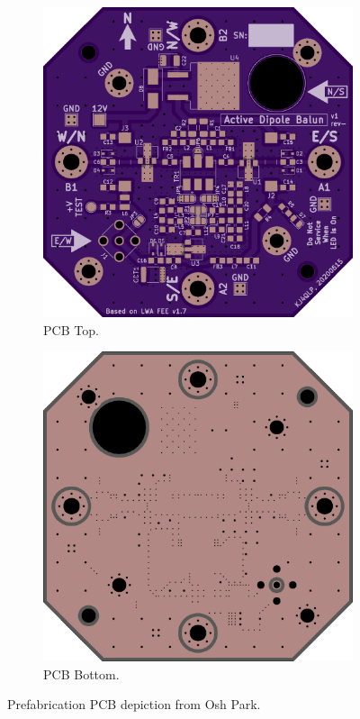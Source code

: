 \begin{figure}[h]
  \centering
  \begin{subfigure}{.45\textwidth}
    \centering
    \includegraphics[width=0.95\linewidth]{figures/osh_park_top_view.png}
    \caption{PCB Top.}
	\label{fig:osh_park:top}
  \end{subfigure}%
  \begin{subfigure}{.45\textwidth}
    \centering
    \includegraphics[width=0.95\linewidth]{figures/osh_park_bottom_view.png}
    \caption{PCB Bottom.}
	\label{fig:osh_park:bottom}
  \end{subfigure}
  \caption{Prefabrication PCB depiction from Osh Park.}
  \label{fig:osh_park}
\end{figure}





